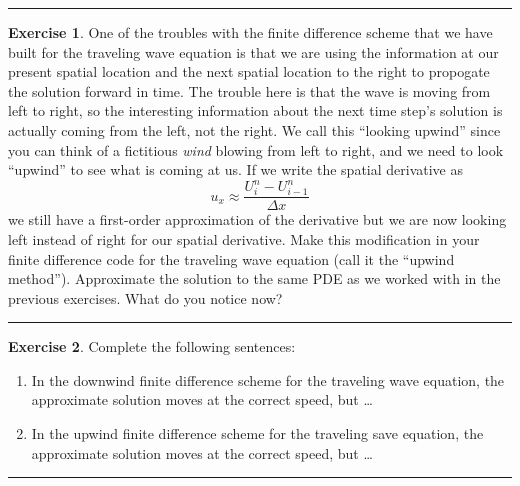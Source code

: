 \documentclass[
]{book}
\providecommand{\tightlist}{%
  \setlength{\itemsep}{0pt}\setlength{\parskip}{0pt}}
\theoremstyle{definition}
\theoremstyle{definition}
\theoremstyle{definition}
\newtheorem{exercise}{Exercise}[chapter]
\theoremstyle{remark}
\begin{document}
\begin{center}\rule{0.5\linewidth}{0.5pt}\end{center}

\begin{exercise}
\protect\hypertarget{exr:unnamed-chunk-591}{}{\label{exr:unnamed-chunk-591} }One of the troubles with the finite difference scheme that we have built for the traveling wave equation is that we are using the information at our present spatial location and the next spatial location to the right to propogate the solution forward in time. The trouble here is that the wave is moving from left to right, so the interesting information about the next time step's solution is actually coming from the left, not the right. We call this ``looking upwind'' since you can think of a fictitious \emph{wind} blowing from left to right, and we need to look ``upwind'' to see what is coming at us. If we write the spatial derivative as
\[ u_x \approx \frac{U_i^n - U_{i-1}^n}{\Delta x}  \]
we still have a first-order approximation of the derivative but we are now looking left instead of right for our spatial derivative. Make this modification in your finite difference code for the traveling wave equation (call it the ``upwind method''). Approximate the solution to the same PDE as we worked with in the previous exercises. What do you notice now?
\end{exercise}

\begin{center}\rule{0.5\linewidth}{0.5pt}\end{center}

\begin{exercise}
\protect\hypertarget{exr:unnamed-chunk-592}{}{\label{exr:unnamed-chunk-592} }Complete the following sentences:

\begin{enumerate}
\def\labelenumi{\alph{enumi}.}
\tightlist
\item
  In the downwind finite difference scheme for the traveling wave equation, the approximate solution moves at the correct speed, but \ldots{}\\
\item
  In the upwind finite difference scheme for the traveling save equation, the approximate solution moves at the correct speed, but \ldots{}
\end{enumerate}
\end{exercise}

\begin{center}\rule{0.5\linewidth}{0.5pt}\end{center}
\end{document}
